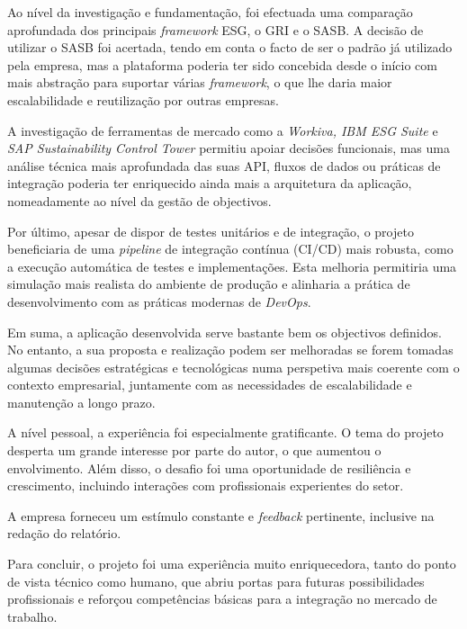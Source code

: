 Ao nível da investigação e fundamentação, foi efectuada uma comparação aprofundada dos principais \textit{framework} ESG, o GRI e o SASB. A decisão de utilizar o SASB foi acertada, tendo em conta o facto de ser o padrão já utilizado pela empresa, mas a plataforma poderia ter sido concebida desde o início com mais abstração para suportar várias \textit{framework}, o que lhe daria maior escalabilidade e reutilização por outras empresas.

A investigação de ferramentas de mercado como a \textit{Workiva, IBM ESG Suite} e \textit{SAP Sustainability Control Tower} permitiu apoiar decisões funcionais, mas uma análise técnica mais aprofundada das suas API, fluxos de dados ou práticas de integração poderia ter enriquecido ainda mais a arquitetura da aplicação, nomeadamente ao nível da gestão de objectivos.

Por último, apesar de dispor de testes unitários e de integração, o projeto beneficiaria de uma \textit{pipeline} de integração contínua (CI/CD) mais robusta, como a execução automática de testes e implementações. Esta melhoria permitiria uma simulação mais realista do ambiente de produção e alinharia a prática de desenvolvimento com as práticas modernas de \textit{DevOps}. 

Em suma, a aplicação desenvolvida serve bastante bem os objectivos definidos. No entanto, a sua proposta e realização podem ser melhoradas se forem tomadas algumas decisões estratégicas e tecnológicas numa perspetiva mais coerente com o contexto empresarial, juntamente com as necessidades de escalabilidade e manutenção a longo prazo.

A nível pessoal, a experiência foi especialmente gratificante. O tema do projeto desperta um grande interesse por parte do autor, o que aumentou o envolvimento. Além disso, o desafio foi uma oportunidade de resiliência e crescimento, incluindo interações com profissionais experientes do setor.

A empresa forneceu um estímulo constante e \textit{feedback} pertinente, inclusive na redação do relatório.

Para concluir, o projeto foi uma experiência muito enriquecedora, tanto do ponto de vista técnico como humano, que abriu portas para futuras possibilidades profissionais e reforçou competências básicas para a integração no mercado de trabalho.